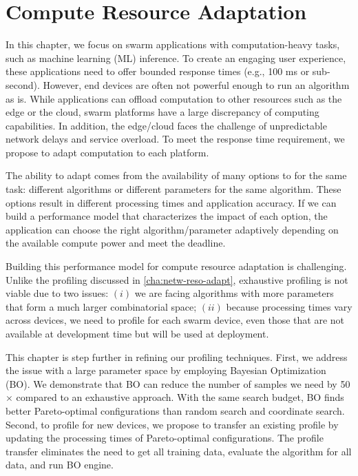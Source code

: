 \documentclass[thesis.tex]{subfiles}
\begin{document}
\chapter{Compute Resource Adaptation}
\label{cha:comp-reso-adapt}

In this chapter, we focus on swarm applications with computation-heavy tasks,
such as machine learning (ML) inference. To create an engaging user experience,
these applications need to offer bounded response times (e.g., 100 ms or
sub-second). However, end devices are often not powerful enough to run an
algorithm as is. While applications can offload computation to other resources
such as the edge or the cloud, swarm platforms have a large discrepancy of
computing capabilities. In addition, the edge/cloud faces the challenge of
unpredictable network delays and service overload. To meet the response time
requirement, we propose to adapt computation to each platform.

The ability to adapt comes from the availability of many options to for the same
task: different algorithms or different parameters for the same algorithm. These
options result in different processing times and application accuracy. If we can
build a performance model that characterizes the impact of each option, the
application can choose the right algorithm/parameter adaptively depending on the
available compute power and meet the deadline.

Building this performance model for compute resource adaptation is
challenging. Unlike the profiling discussed in \autoref{cha:netw-reso-adapt},
exhaustive profiling is not viable due to two issues: $(i)$ we are facing
algorithms with more parameters that form a much larger combinatorial space;
$(ii)$ because processing times vary across devices, we need to profile for each
swarm device, even those that are not available at development time but will be
used at deployment.

This chapter is step further in refining our profiling techniques. First, we
address the issue with a large parameter space by employing Bayesian
Optimization (BO). We demonstrate that BO can reduce the number of samples we
need by 50$\times$ compared to an exhaustive approach. With the same search
budget, BO finds better Pareto-optimal configurations than random search and
coordinate search. Second, to profile for new devices, we propose to transfer an
existing profile by updating the processing times of Pareto-optimal
configurations. The profile transfer eliminates the need to get all training
data, evaluate the algorithm for all data, and run BO engine.






\end{document}

